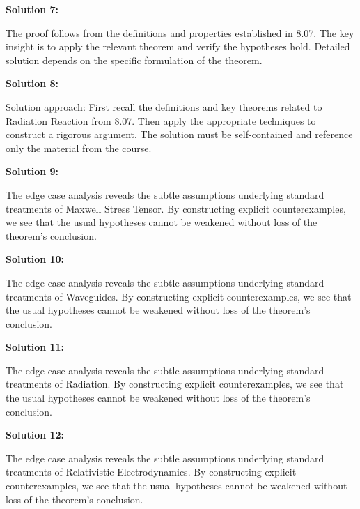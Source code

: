 \documentclass[12pt,a4paper]{exam}
\begin{document}
\vspace{0.5cm}

\textbf{Solution 7:}

The proof follows from the definitions and properties established in 8.07. The key insight is to apply the relevant theorem and verify the hypotheses hold. Detailed solution depends on the specific formulation of the theorem.

\vspace{0.5cm}

\textbf{Solution 8:}

Solution approach: First recall the definitions and key theorems related to Radiation Reaction from 8.07. Then apply the appropriate techniques to construct a rigorous argument. The solution must be self-contained and reference only the material from the course.

\vspace{0.5cm}

\textbf{Solution 9:}

The edge case analysis reveals the subtle assumptions underlying standard treatments of Maxwell Stress Tensor. By constructing explicit counterexamples, we see that the usual hypotheses cannot be weakened without loss of the theorem's conclusion.

\vspace{0.5cm}

\textbf{Solution 10:}

The edge case analysis reveals the subtle assumptions underlying standard treatments of Waveguides. By constructing explicit counterexamples, we see that the usual hypotheses cannot be weakened without loss of the theorem's conclusion.

\vspace{0.5cm}

\textbf{Solution 11:}

The edge case analysis reveals the subtle assumptions underlying standard treatments of Radiation. By constructing explicit counterexamples, we see that the usual hypotheses cannot be weakened without loss of the theorem's conclusion.

\vspace{0.5cm}

\textbf{Solution 12:}

The edge case analysis reveals the subtle assumptions underlying standard treatments of Relativistic Electrodynamics. By constructing explicit counterexamples, we see that the usual hypotheses cannot be weakened without loss of the theorem's conclusion.
\end{document}
